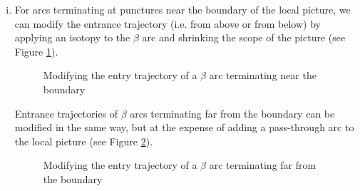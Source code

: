 \documentclass[11pt]{article}
\theoremstyle{plain} \newtheorem{thm}{Theorem}[subsection]
\theoremstyle{plain} \newtheorem{cor}[thm]{Corollary}
\theoremstyle{plain} \newtheorem{prop}[thm]{Proposition}
\theoremstyle{plain} \newtheorem{conj}[thm]{Conjecture}
\theoremstyle{plain} \newtheorem{lem}[thm]{Lemma}
\theoremstyle{definition} \newtheorem{df}[thm]{Definition}
\theoremstyle{remark} \newtheorem{rmk}[thm]{Remark}
\theoremstyle{remark} \newtheorem{obs}[thm]{Observation}
\begin{document}
\begin{enumerate}[(i)]
\item  For arcs terminating at punctures near the boundary of the local picture, we can modify the entrance trajectory (i.e. from above or from below) by applying an isotopy to the $\beta$ arc and shrinking the scope of the picture (see Figure \ref{fig:gen1}).

\begin{figure}[h]
\centering
\qquad
{}
\caption[The entry trajectory of a $\beta$ arc terminating near the boundary]{Modifying the entry trajectory of a $\beta$ arc terminating near the boundary}
\label{fig:gen1}
\end{figure}

Entrance trajectories of $\beta$ arcs terminating far from the boundary can be modified in the same way, but at the expense of adding a pass-through arc to the local picture (see Figure \ref{fig:gen2}).
\begin{figure}[h]
\centering
\qquad
{}
\caption[The entry trajectory of a $\beta$ arc terminating away from the boundary]{Modifying the entry trajectory of a $\beta$ arc terminating far from the boundary}
\label{fig:gen2}
\end{figure}

\end{enumerate}
\end{document}
